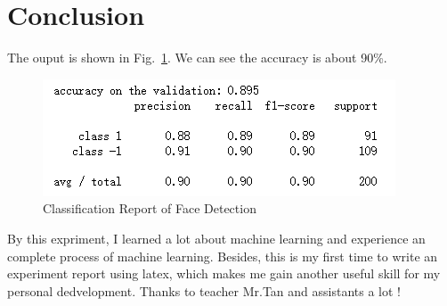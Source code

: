 \documentclass[journal, a4paper]{IEEEtran}
\begin{document}



\section{Conclusion}
	The ouput is shown in Fig.~\ref{fig:tf_plot}. We can see the accuracy is about 90\%.
	\begin{figure}[!hbt]
	\begin{center}
		\includegraphics[width=\columnwidth]{result}
		\centering
		\caption{\quad Classification Report of Face Detection}
		\label{fig:tf_plot}
	\end{center}
	\end{figure}
\par
By this expriment, I learned a lot about machine learning and experience an complete process of machine learning. Besides, this is my first time to write an experiment report using latex, which makes me gain another useful skill for my personal dedvelopment. Thanks to teacher Mr.Tan and assistants a lot ! 

\end{document}

